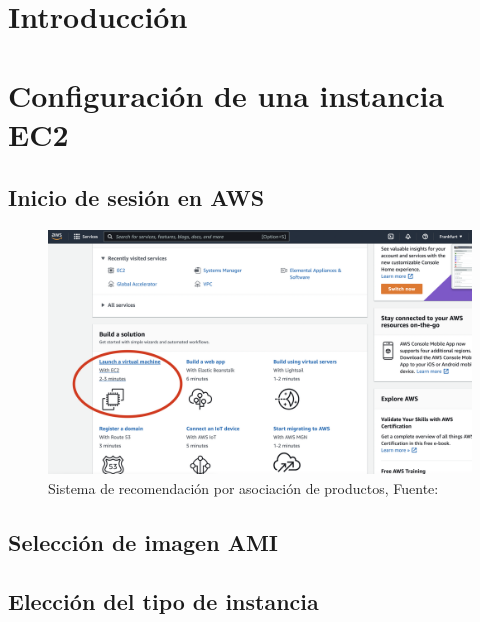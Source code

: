 %
%

\section{Introducción}

\lipsum[2-4]

\section{Configuración de una instancia EC2}
\subsection{Inicio de sesión en AWS}

\begin{figure}[h]
	\centering
	\includegraphics[scale=.3] {img/ejemplo}
	\caption{Sistema de recomendación por asociación de productos, Fuente: }
	\label{fig:5}	
\end{figure} 

\lipsum[2-4]

\subsection{Selección de imagen AMI}
\lipsum[2-4]

\subsection{Elección del tipo de instancia}
\lipsum[2-4]

